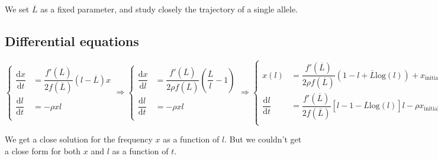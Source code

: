 \documentclass{article}
\begin{document}
We set $\overline{L}$ as a fixed parameter, and study closely the trajectory of a single allele.


\subsection{Differential equations}

\begin{equation}
  \left\{
      \begin{aligned}
          \dfrac{\mathrm{d}x}{\mathrm{d}t} &= \dfrac{f'(\overline{L})}{2 f(\overline{L})} \left( l - \overline{L} \right) x \\
        \dfrac{\mathrm{d}l}{\mathrm{d}t} &= 
        - \rho x l \\
      \end{aligned}
    \right.
 \Rightarrow
  \left\{
      \begin{aligned}
          \dfrac{\mathrm{d}x}{\mathrm{d}l} &= \dfrac{f'(\overline{L})}{2 \rho f(\overline{L})}\left( \dfrac{\overline{L}}{l} -1 \right) \\
        \dfrac{\mathrm{d}l}{\mathrm{d}t} &= 
        - \rho x l \\
      \end{aligned}
    \right.
 \Rightarrow
  \left\{
      \begin{aligned}
          x(l) &=\dfrac{f'(\overline{L})}{2 \rho f(\overline{L})} (1-l + \overline{L} \mathrm{log}(l)) + x_{\mathrm{initial}} \\
        \dfrac{\mathrm{d}l}{\mathrm{d}t} &= 
         \dfrac{f'(\overline{L})}{2 f(\overline{L})} [ l-1- \overline{L} \mathrm{log}(l)]l  - \rho x_{\mathrm{initial}} l \\
      \end{aligned}
    \right.
\end{equation}

We get a close solution for the frequency $x$ as a function of $l$. But we couldn't get a close form for both $x$ and $l$ as a function of $t$.
\end{document}
